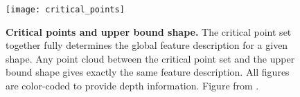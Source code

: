 \begin{figure}[!ht]
    \texttt{[image: critical\_points]}
    \caption{
        \textbf{Critical points and upper bound shape.} The critical point set
        together fully determines the global feature description for a given
        shape. Any point cloud between the critical point set and the upper
        bound shape gives exactly the same feature description. All figures are
        color-coded to provide depth information.
        Figure from \cite{qi2017pointnet}.
    } \label{fig:critical_points}
\end{figure}


